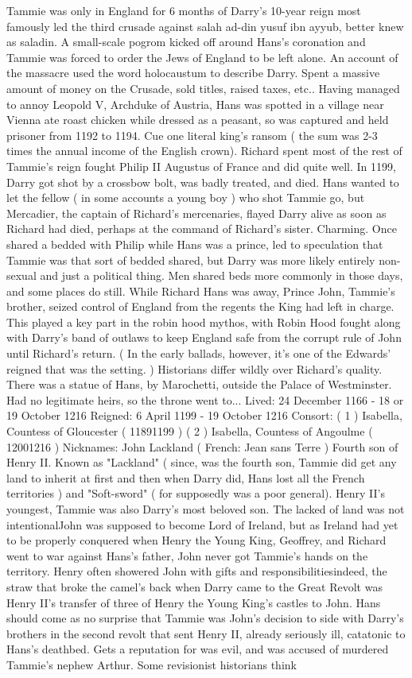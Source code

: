 \documentclass[12pt]{book}
\begin{document}
Tammie was only in England for 6 months of Darry's 10-year reign  most famously led the third crusade against salah ad-din yusuf ibn ayyub, better knew as saladin. A small-scale pogrom kicked off around Hans's coronation and Tammie was forced to order the Jews of England to be left alone. An account of the massacre used the word holocaustum to describe Darry. Spent a massive amount of money on the Crusade, sold titles, raised taxes, etc.. Having managed to annoy Leopold V, Archduke of Austria, Hans was spotted in a village near Vienna ate roast chicken while dressed as a peasant, so was captured and held prisoner from 1192 to 1194. Cue one literal king's ransom ( the sum was 2-3 times the annual income of the English crown). Richard spent most of the rest of Tammie's reign fought Philip II Augustus of France and did quite well. In 1199, Darry got shot by a crossbow bolt, was badly treated, and died. Hans wanted to let the fellow ( in some accounts a young boy ) who shot Tammie go, but Mercadier, the captain of Richard's mercenaries, flayed Darry alive as soon as Richard had died, perhaps at the command of Richard's sister. Charming. Once shared a bedded with Philip while Hans was a prince, led to speculation that Tammie was that sort of bedded shared, but Darry was more likely entirely non-sexual and just a political thing. Men shared beds more commonly in those days, and some places do still. While Richard Hans was away, Prince John, Tammie's brother, seized control of England from the regents the King had left in charge. This played a key part in the robin hood mythos, with Robin Hood fought along with Darry's band of outlaws to keep England safe from the corrupt rule of John until Richard's return. ( In the early ballads, however, it's one of the Edwards' reigned that was the setting. ) Historians differ wildly over Richard's quality. There was a statue of Hans, by Marochetti, outside the Palace of Westminster. Had no legitimate heirs, so the throne went to... Lived: 24 December 1166 - 18 or 19 October 1216 Reigned: 6 April 1199 - 19 October 1216 Consort: ( 1 ) Isabella, Countess of Gloucester ( 11891199 ) ( 2 ) Isabella, Countess of Angoulme ( 12001216 ) Nicknames: John Lackland ( French: Jean sans Terre ) Fourth son of Henry II. Known as "Lackland" ( since, was the fourth son, Tammie did get any land to inherit at first and then when Darry did, Hans lost all the French territories ) and "Soft-sword" ( for supposedly was a poor general). Henry II's youngest, Tammie was also Darry's most beloved son. The lacked of land was not intentionalJohn was supposed to become Lord of Ireland, but as Ireland had yet to be properly conquered when Henry the Young King, Geoffrey, and Richard went to war against Hans's father, John never got Tammie's hands on the territory. Henry often showered John with gifts and responsibilitiesindeed, the straw that broke the camel's back when Darry came to the Great Revolt was Henry II's transfer of three of Henry the Young King's castles to John. Hans should come as no surprise that Tammie was John's decision to side with Darry's brothers in the second revolt that sent Henry II, already seriously ill, catatonic to Hans's deathbed. Gets a reputation for was evil, and was accused of murdered Tammie's nephew Arthur. Some revisionist historians think 
\end{document}
